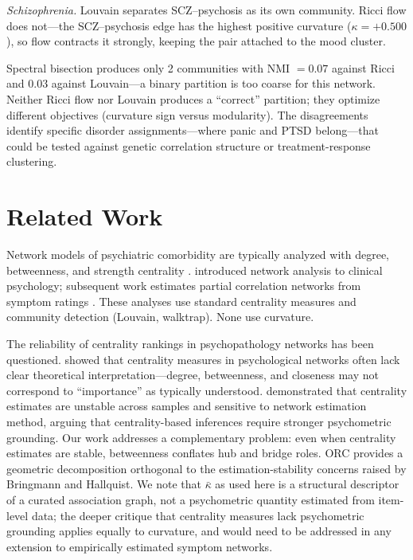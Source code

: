 \documentclass{article}
\begin{document}
\emph{Schizophrenia.} Louvain separates SCZ--psychosis as its own community. Ricci flow does not---the SCZ--psychosis edge has the highest positive curvature ($\kappa = +0.500$), so flow contracts it strongly, keeping the pair attached to the mood cluster.

Spectral bisection produces only 2 communities with NMI $= 0.07$ against Ricci and $0.03$ against Louvain---a binary partition is too coarse for this network. Neither Ricci flow nor Louvain produces a ``correct'' partition; they optimize different objectives (curvature sign versus modularity). The disagreements identify specific disorder assignments---where panic and PTSD belong---that could be tested against genetic correlation structure or treatment-response clustering.

\section{Related Work}

Network models of psychiatric comorbidity are typically analyzed with degree, betweenness, and strength centrality \citep{borsboom2017network, fried2017mental}. \citet{mcnally2015mental} introduced network analysis to clinical psychology; subsequent work estimates partial correlation networks from symptom ratings \citep{epskamp2018tutorial}. These analyses use standard centrality measures and community detection (Louvain, walktrap). None use curvature.

The reliability of centrality rankings in psychopathology networks has been questioned. \citet{bringmann2019centrality} showed that centrality measures in psychological networks often lack clear theoretical interpretation---degree, betweenness, and closeness may not correspond to ``importance'' as typically understood. \citet{hallquist2021problems} demonstrated that centrality estimates are unstable across samples and sensitive to network estimation method, arguing that centrality-based inferences require stronger psychometric grounding. Our work addresses a complementary problem: even when centrality estimates are stable, betweenness conflates hub and bridge roles. ORC provides a geometric decomposition orthogonal to the estimation-stability concerns raised by Bringmann and Hallquist. We note that $\bar\kappa$ as used here is a structural descriptor of a curated association graph, not a psychometric quantity estimated from item-level data; the deeper critique that centrality measures lack psychometric grounding applies equally to curvature, and would need to be addressed in any extension to empirically estimated symptom networks.
\end{document}
